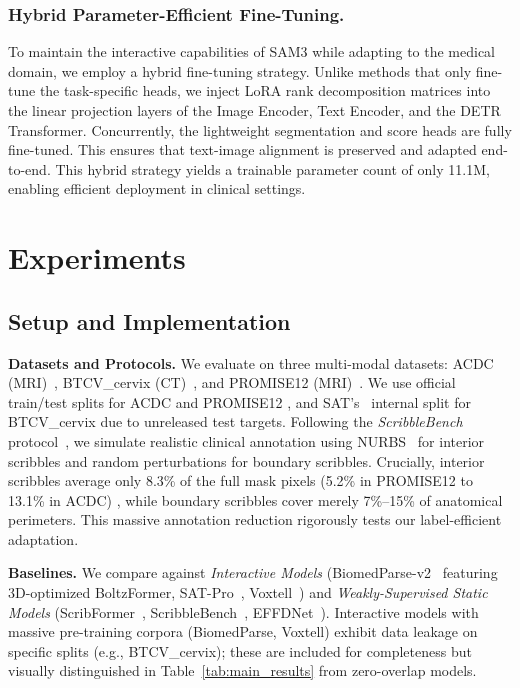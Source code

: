 \documentclass[runningheads]{llncs}
\begin{document}
\subsubsection{Hybrid Parameter-Efficient Fine-Tuning.}
To maintain the interactive capabilities of SAM3 while adapting to the medical domain, we employ a hybrid fine-tuning strategy. Unlike methods that only fine-tune the task-specific heads, we inject LoRA rank decomposition matrices into the linear projection layers of the Image Encoder, Text Encoder, and the DETR Transformer. Concurrently, the lightweight segmentation and score heads are fully fine-tuned. This ensures that text-image alignment is preserved and adapted end-to-end. This hybrid strategy yields a trainable parameter count of only 11.1M, enabling efficient deployment in clinical settings.


\section{Experiments}
\subsection{Setup and Implementation}

\noindent\textbf{Datasets and Protocols.} We evaluate on three multi-modal datasets: ACDC (MRI)~\cite{bernard2018acdc}, BTCV\_cervix (CT)~\cite{landman2015btcv}, and PROMISE12 (MRI)~\cite{litjens2014promise}. We use official train/test splits for ACDC and PROMISE12 , and SAT's~\cite{zhao2025sat} internal split for BTCV\_cervix due to unreleased test targets. Following the \textit{ScribbleBench} protocol~\cite{gotkowski2025scribblebench}, we simulate realistic clinical annotation using NURBS~\cite{piegl2012nurbs} for interior scribbles and random perturbations for boundary scribbles. Crucially, interior scribbles average only 8.3\% of the full mask pixels (5.2\% in PROMISE12 to 13.1\% in ACDC) , while boundary scribbles cover merely 7\%--15\% of anatomical perimeters. This massive annotation reduction rigorously tests our label-efficient adaptation.

\noindent\textbf{Baselines.} We compare against \textit{Interactive Models} (BiomedParse-v2~\cite{zhao2025biomedparse,zhao2025boltzmann} featuring 3D-optimized BoltzFormer, SAT-Pro~\cite{zhao2025sat}, Voxtell~\cite{rokuss2025voxtell}) and \textit{Weakly-Supervised Static Models} (ScribFormer~\cite{li2024ScribFormer}, ScribbleBench~\cite{gotkowski2025scribblebench}, EFFDNet~\cite{liu2025effdnet}). Interactive models with massive pre-training corpora (BiomedParse, Voxtell) exhibit data leakage on specific splits (e.g., BTCV\_cervix); these are included for completeness but visually distinguished in Table~\ref{tab:main_results} from zero-overlap models.
\end{document}
